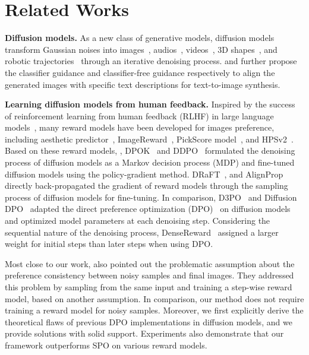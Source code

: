 \section{Related Works}
\label{sec: related_works}

\textbf{Diffusion models.}
As a new class of generative models, diffusion models~\citep{shol2015deep,ho2020DDPM,song2021DDIM} transform Gaussian noises into images~\citep{dhariwal2021diffusion,ho2022cascaded,nichol2022glide,rombach2022LDM}, audios~\citep{liu2023audioldm}, videos~\citep{ho2022imagenvideo,singer2023video}, 3D shapes~\citep{zeng2022lion,poole2023dreamfusion,gu2023nerfdiff}, and robotic trajectories~\citep{janner2022planning,chen2024simple} through an iterative denoising process.
\citet{dhariwal2021diffusion} and \citet{ho2022classifier} further propose the classifier guidance and classifier-free guidance respectively to align the generated images with specific text descriptions for text-to-image synthesis.

\textbf{Learning diffusion models from human feedback.}
Inspired by the success of reinforcement learning from human feedback (RLHF) in large language models~\citep{ouyang2022rlhf,bai2022anthropic,openai2023gpt4}, many reward models have been developed for images preference, including aesthetic predictor~\citep{schuhmann2022laion}, ImageReward~\citep{xu2023imagereward}, PickScore model~\citep{kirstain2023pick}, and HPSv2~\citep{wu2023hps}.
Based on these reward models, \citet{lee2023aligning}, DPOK~\citep{ying2023dpok} and DDPO~\citep{black2024ddpo} formulated the denoising process of diffusion models as a Markov decision process (MDP) and fine-tuned diffusion models using the policy-gradient method.
DRaFT~\citep{clark2024draft}, and AlignProp~\citep{prabhudesai2023alignprop} directly back-propagated the gradient of reward models through the sampling process of diffusion models for fine-tuning.
In comparison, D3PO~\cite{yang2024d3po} and Diffusion DPO~\citep{wallace2024diffusiondpo} adapted the direct preference optimization (DPO)~\citep{rafailov2023DPO} on diffusion models and optimized model parameters at each denoising step. 
Considering the sequential nature of the denoising process, DenseReward~\citep{yang2024densereward} assigned a larger weight for initial steps than later steps when using DPO.

Most close to our work, \citet{liang2024spo} also pointed out the problematic assumption about the preference consistency between noisy samples and final images.
They addressed this problem by sampling from the same input and training a step-wise reward model, based on another assumption.
In comparison, our method does not require training a reward model for noisy samples.
Moreover, we first explicitly derive the theoretical flaws of previous DPO implementations in diffusion models, and we provide solutions with solid support.
Experiments also demonstrate that our framework outperforms SPO on various reward models.